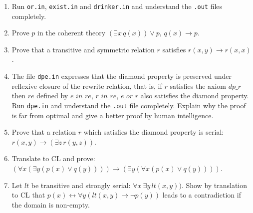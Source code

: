 \documentclass{article}
\begin{document}
\begin{enumerate}
\item Run \texttt{or.in}, \texttt{exist.in} and \texttt{drinker.in}
  and understand the \texttt{.out} files completely.

\item Prove $p$ in the coherent theory $(\exists x\, q(x)) \vee p,\, q(x)
  \to p$.
  
\item Prove that a transitive and symmetric relation $r$ satisfies
  $r(x,y) \to r(x,x)$.
  
\item The file \texttt{dpe.in} expresses that the diamond property is
  preserved under reflexive closure of the rewrite relation, that is,
  if $r$ satisfies the axiom $\mathit{dp\_r}$ then $\mathit{re}$
  defined by $\mathit{e\_in\_re}$, $\mathit{r\_in\_re}$,
  $\mathit{e\_or\_r}$ also satisfies the diamond property.  Run
  \texttt{dpe.in} and understand the \texttt{.out} file completely.
  Explain why the proof is far from optimal and give a better proof by
  human intelligence.
  
\item Prove that a relation $r$ which satisfies the diamond property
  is serial: $r(x,y) \to (\exists z\, r(y,z))$.
  
\item Translate to CL and prove: $(\forall x (\exists y (p(x) \vee q(y))))
  \to (\exists y (\forall x (p(x) \vee q(y))))$.
  
\item Let $\mathit{lt}$ be transitive and strongly serial: 
$\forall x~\exists y\, lt(x,y))$. Show
  by translation to CL that $p(x) \leftrightarrow \forall y
  (\mathit{lt}(x,y) \to \neg p(y))$ leads to a contradiction if the
  domain is non-empty.

\end{enumerate}   
\end{document}
